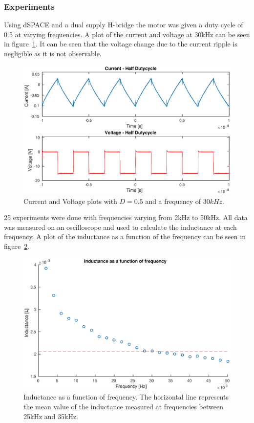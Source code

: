 \subsubsection{Experiments}
Using dSPACE and a dual supply H-bridge the motor was given a duty cycle of 0.5 at varying frequencies.
A plot of the current and voltage at 30kHz can be seen in figure~\ref{fig:half_duty}.
It can be seen that the voltage change due to the current ripple is negligible as it is not observable.


\begin{figure}[!h]
	\centering
	\includegraphics[width=.75\linewidth]{graphics/half_duty}
	\caption{Current and Voltage plots with $D = 0.5$ and a frequency of $30kHz$.}
	\label{fig:half_duty}
\end{figure}

25 experiments were done with frequencies varying from 2kHz to 50kHz.
All data was measured on an oscilloscope and used to calculate the inductance at each frequency.
A plot of the inductance as a function of the frequency can be seen in figure~\ref{fig:inductance_freq}.

\begin{figure}[!h]
	\centering
	\includegraphics[width=.75\linewidth]{graphics/l_freq}
	\caption[Inductance as a function of frequency.]{Inductance as a function of frequency. The horizontal line represents the mean value of the inductance measured at frequencies between 25kHz and 35kHz.}
	\label{fig:inductance_freq}
\end{figure}

